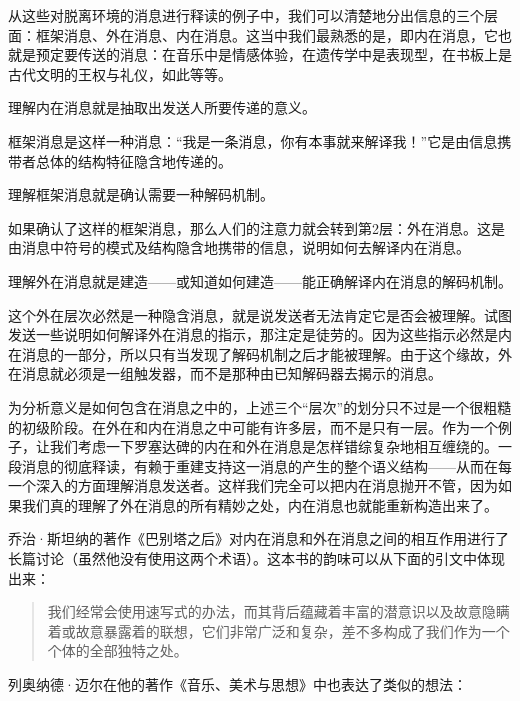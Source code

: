 从这些对脱离环境的消息进行释读的例子中，我们可以清楚地分出信息的三个层面：框架消息、外在消息、内在消息。这当中我们最熟悉的是，即内在消息，它也就是预定要传送的消息：在音乐中是情感体验，在遗传学中是表现型，在书板上是古代文明的王权与礼仪，如此等等。

\begin{block}
理解内在消息就是抽取出发送人所要传递的意义。
\end{block}

框架消息是这样一种消息：“我是一条消息，你有本事就来解译我！”它是由信息携带者总体的结构特征隐含地传递的。

\begin{block}
理解框架消息就是确认需要一种解码机制。
\end{block}

如果确认了这样的框架消息，那么人们的注意力就会转到第2层：外在消息。这是由消息中符号的模式及结构隐含地携带的信息，说明如何去解译内在消息。

\begin{block}
理解外在消息就是建造——或知道如何建造——能正确解译内在消息的解码机制。
\end{block}

这个外在层次必然是一种隐含消息，就是说发送者无法肯定它是否会被理解。试图发送一些说明如何解译外在消息的指示，那注定是徒劳的。因为这些指示必然是内在消息的一部分，所以只有当发现了解码机制之后才能被理解。由于这个缘故，外在消息就必须是一组触发器，而不是那种由已知解码器去揭示的消息。

为分析意义是如何包含在消息之中的，上述三个“层次”的划分只不过是一个很粗糙的初级阶段。在外在和内在消息之中可能有许多层，而不是只有一层。作为一个例子，让我们考虑一下罗塞达碑的内在和外在消息是怎样错综复杂地相互缠绕的。一段消息的彻底释读，有赖于重建支持这一消息的产生的整个语义结构——从而在每一个深入的方面理解消息发送者。这样我们完全可以把内在消息抛开不管，因为如果我们真的理解了外在消息的所有精妙之处，内在消息也就能重新构造出来了。

乔治·斯坦纳的著作《巴别塔之后》对内在消息和外在消息之间的相互作用进行了长篇讨论（虽然他没有使用这两个术语）。这本书的韵味可以从下面的引文中体现出来：

\begin{quote}
我们经常会使用速写式的办法，而其背后蕴藏着丰富的潜意识以及故意隐瞒着或故意暴露着的联想，它们非常广泛和复杂，差不多构成了我们作为一个个体的全部独特之处。
\end{quote}
列奥纳德·迈尔在他的著作《音乐、美术与思想》中也表达了类似的想法：

